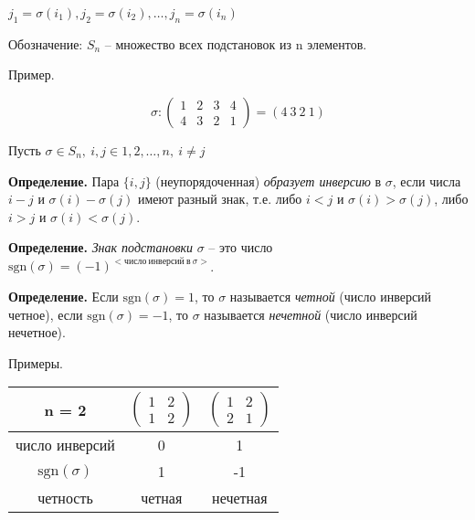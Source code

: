 $j_1 = \sigma (i_1), j_2 = \sigma (i_2), \dots, j_n = \sigma (i_n)$

\vspace{\baselineskip}
Обозначение: $S_n$ -- множество всех подстановок из n элементов.

\vspace{\baselineskip}
Пример.

\begin{equation*} \sigma : \begin{pmatrix} 1 & 2 & 3 & 4 \\ 4 & 3 & 2 & 1 \end{pmatrix} = (4 \ 3 \ 2 \ 1) \end{equation*}

\vspace{\baselineskip}
Пусть $\sigma \in S_n, \ i, j \in {1, 2, \dots, n}, \ i \neq j$

\vspace{\baselineskip}
\textbf{Определение.} Пара $\{i, j\}$ (неупорядоченная) \textit{образует инверсию} в $\sigma$, если числа $i-j$ и $\sigma (i) - \sigma (j)$ имеют разный знак, т.е. либо $i < j$ и $\sigma (i) > \sigma (j)$, либо $i > j$ и $\sigma (i) < \sigma (j)$.

\vspace{\baselineskip}
\textbf{Определение.} \textit{Знак подстановки} $\sigma$ -- это  число $\mathrm{sgn} (\sigma) = (-1) ^{<число \ инверсий \ в \ \sigma>}$.

\vspace{\baselineskip}
\textbf{Определение.} Если $\mathrm{sgn}(\sigma) = 1$, то $\sigma$ называется \textit{четной} (число инверсий четное), если $\mathrm{sgn}(\sigma) = -1$, то $\sigma$ называется \textit{нечетной} (число инверсий нечетное).

\vspace{\baselineskip}
Примеры.

\begin{table}[!ht]
		\begin{tabular}{c|c|c}
    	n = 2 & $\begin{pmatrix} 1 & 2 \\ 1 & 2 \end{pmatrix}$ & $\begin{pmatrix} 1 & 2 \\ 2 & 1 \end{pmatrix}$ \\
        \hline
       число инверсий & 0 & 1 \\
       \hline
          $\mathrm{sgn} (\sigma)$ & 1 & -1 \\
          \hline
        четность & четная & нечетная
		\end{tabular}
\end{table}

